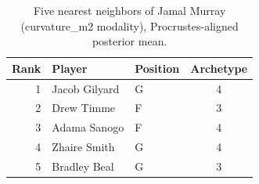 \begin{table}[htbp]
  \centering\small
  \begin{tabular}{rllc}
    \toprule
    Rank & Player & Position & Archetype \\
    \midrule
    1 & Jacob Gilyard & G & 4 \\
    2 & Drew Timme & F & 3 \\
    3 & Adama Sanogo & F & 4 \\
    4 & Zhaire Smith & G & 4 \\
    5 & Bradley Beal & G & 3 \\
    \bottomrule
  \end{tabular}
  \caption{Five nearest neighbors of Jamal Murray (curvature_m2 modality), Procrustes-aligned posterior mean.}
  \label{tab:Jamal_Murray_neighbors_curvature_m2}
\end{table}


